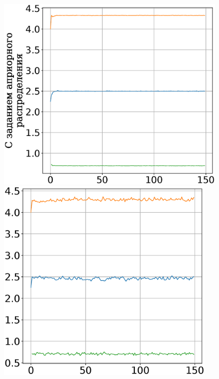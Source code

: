 \documentclass[12pt, twoside]{article}
\numberwithin{equation}{section}
\begin{document}
\begin{figure}[h]
\begin{minipage}{.32\textwidth}
\hspace{-3mm}
      \includegraphics[width = 1.05\textwidth]{figures/910noise.eps}
\end{minipage}
\begin{minipage}{.32\textwidth}
\vspace{2pt}
\hspace{-2.1mm}
      \includegraphics[width = 0.95\textwidth]{figures/911noise.eps}

\end{minipage}
\end{figure}
\end{document}

